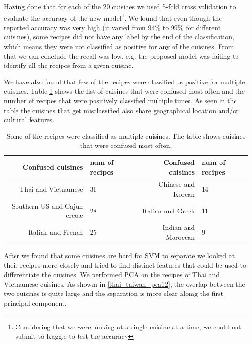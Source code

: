 \documentclass[prodmode,acmtap]{acmlarge}
\begin{document}
Having done that for each of the 20 cuisines we used 5-fold cross validation to evaluate the accuracy of the new model\footnote{Considering that we were looking at a single cuisine at a time, we could not submit to Kaggle to test the accuracy}. We found that even though the reported accuracy was very high (it varied from 94\% to 99\% for different cuisines), some recipes did not have any label by the end of the classification, which means they were not classified as positive for any of the cuisines. From that we can conclude the recall was low, e.g. the proposed model was failing to identify all the recipes from a given cuisine. 

We have also found that few of the recipes were classified as positive for multiple cuisines. Table \ref{confusiontable} shows the list of cuisines that were confused most often and the number of recipes that were positively classified multiple times. As seen in the table the cuisines that get misclassified also share geographical location and/or cultural features. 

\begin {table}
\centering
\begin{tabular}{|r|l||r|l|}
  \hline
  Confused cuisines & num of recipes & Confused cuisines & num of recipes \\
  \hline
  Thai and Vietnamese & 31 & Chinese and Korean & 14\\
  Southern US and Cajun creole & 28 & Italian and Greek & 11\\
  Italian and French & 25 & Indian and Moroccan & 9 \\
  \hline
\end{tabular}
\caption{Some of the recipes were classified as multiple cuisines. The table shows cuisines that were confused most often.}
\label{confusiontable}
\end {table}

After we found that some cuisines are hard for SVM to separate we looked at their recipes more closely and tried to find distinct features that could be used to differentiate the cuisines. We performed PCA on the recipes of Thai and Vietnamese cuisines. As showm in \ref{thai_taiwan_pca12}, the overlap between the two cuisines is quite large and the separation is more clear alomg the first principal component. 
\end{document}
